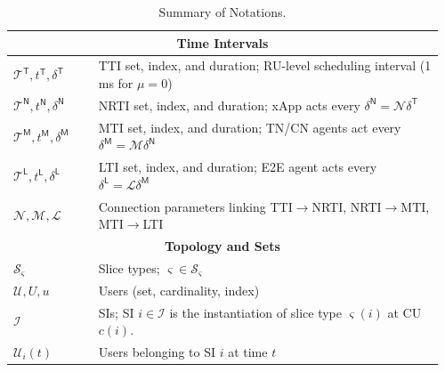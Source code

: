 \documentclass[12pt,lettersize,journal,onecolumn]{IEEEtran}
\begin{document}
\begin{table}[htbp]
\centering
\footnotesize
\caption{Summary of Notations.}
\label{tab:notations}
\begin{tabular}{@{}p{0.192\linewidth}p{0.77\linewidth}@{}}
    \toprule
    \multicolumn{2}{c}{\textbf{Time Intervals}} \\
    \midrule
    $\mathcal{T}^{\mathsf{T}}, t^{\mathsf{T}}, \delta^{\mathsf{T}}$ &
    TTI set, index, and duration; RU-level scheduling interval (1 ms for $\mu=0$) \\
    $\mathcal{T}^{\mathsf{N}}, t^{\mathsf{N}}, \delta^{\mathsf{N}}$ &
    NRTI set, index, and duration; xApp acts every $\delta^{\mathsf{N}}=\mathscr{N}\delta^{\mathsf{T}}$ \\
    $\mathcal{T}^{\mathsf{M}}, t^{\mathsf{M}}, \delta^{\mathsf{M}}$ &
    MTI set, index, and duration; TN/CN agents act every $\delta^{\mathsf{M}}=\mathscr{M}\delta^{\mathsf{N}}$ \\
    $\mathcal{T}^{\mathsf{L}}, t^{\mathsf{L}}, \delta^{\mathsf{L}}$ &
    LTI set, index, and duration; E2E agent acts every $\delta^{\mathsf{L}}=\mathscr{L}\delta^{\mathsf{M}}$ \\
    $\mathscr{N}, \mathscr{M}, \mathscr{L}$ &
    Connection parameters linking TTI$\rightarrow$NRTI, NRTI$\rightarrow$MTI, MTI$\rightarrow$LTI \\ %
    \midrule    
    \multicolumn{2}{c}{\textbf{Topology and Sets}} \\
    \midrule
    $\mathcal{S}_{\varsigma}$ & Slice types; $\varsigma\in\mathcal{S}_{\varsigma}$ \\
    $\mathcal{U},U,u$ & Users (set, cardinality, index) \\
    $\mathcal{I}$ & SIs; SI $i\in\mathcal{I}$ is the instantiation of slice type $\varsigma(i)$ at CU $c(i)$. \\
    $\mathcal{U}_{i}(t)$ & Users belonging to SI $i$ at time $t$ \\

\end{tabular}
\end{table}
\end{document}
